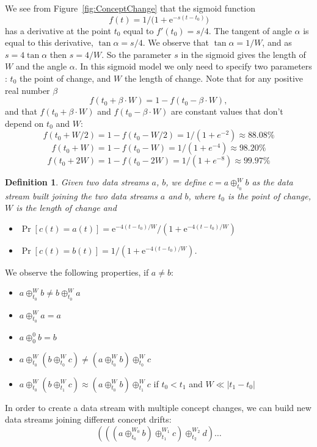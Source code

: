 \documentclass[a4paper,12pt,twoside]{book}
\newtheorem{definition}{Definition}{}
\begin{document}
We see from Figure~\ref{fig:ConceptChange} that the sigmoid function 
$$f(t) = 1/{(1+ \mathrm e^{-s (t-t_0)}})$$
has a derivative at the point $t_0$ equal to $f'(t_0) = s/4$. The tangent of angle 
$\alpha$ is equal to this derivative, $\tan \alpha = s/4$. We observe that 
$ \tan \alpha = 1/ W$,
and as $s= 4 \tan \alpha$ then $s=4/W$. So the parameter $s$ in the sigmoid 
gives the length of $W$ and the angle $\alpha$. 
In this sigmoid model we only need to specify two parameters : 
$t_0$ the point of change, and $W$ the length of change.
Note that for any positive real number $\beta$ $$f(t_0+\beta \cdot W)=1 -f(t_0-\beta \cdot W),$$ and  that $f(t_0+\beta \cdot W)$ and $f(t_0-\beta \cdot W)$ 
are constant values that don't depend on $t_0$ and $W$: 
$$f(t_0+W/2) = 1 - f(t_0-W/2) = 1/( 1+ e^{-2}) \approx 88.08 \%$$  
$$f(t_0+W) = 1 - f(t_0-W) = 1/( 1+ e^{-4}) \approx 98.20 \%$$  
$$f(t_0+2W) = 1 - f(t_0-2W) = 1/( 1+ e^{-8}) \approx 99.97 \%$$
\begin{definition} %
Given two data streams $a$, $b$, we define $c = a  \oplus^{W}_{t_0} b$ as the 
data stream built joining the two data streams $a$ and $b$, where
$t_0$ is the point of change, $W$ is the length of change and 
\begin{itemize}
 \item $\Pr[ c(t) = a(t)] = \mathrm e^{-4(t-t_0)/W}/{(1+ \mathrm e^{-4(t-t_0)/W})}$
 \item $\Pr[ c(t) = b(t)] = 1/{(1+ \mathrm e^{-4(t-t_0)/W})}$.
\end{itemize}
\end{definition}

\BEGINOMIT
We observe the following properties, if $a \ne b$:
\begin{itemize}
 \item $a \oplus^{W}_{t_0} b \neq b \oplus^{W}_{t_0} a$
 \item $a \oplus^{W}_{t_0} a = a$
 \item $a \oplus^{0}_{0} b = b$
 \item $a \oplus^{W}_{t_0} ( b \oplus^{W}_{t_0} c) \neq (a \oplus^{W}_{t_0}  b)
	 \oplus^{W}_{t_0} c$
 \item $a \oplus^{W}_{t_0} ( b \oplus^{W}_{t_1} c) \approx (a \oplus^{W}_{t_0}  b)
	 \oplus^{W}_{t_1} c$ if $t_0<t_1$ and $W \ll |t_1-t_0|$
\end{itemize}
In order to create a data stream with multiple concept changes, we can build new 
data streams joining different concept drifts:
$$( ( (a \oplus^{W_0}_{t_0}  b) \oplus^{W_1}_{t_1} c) \oplus^{W_2}_{t_2} d ) \ldots $$ 
\ENDOMIT
\end{document}
